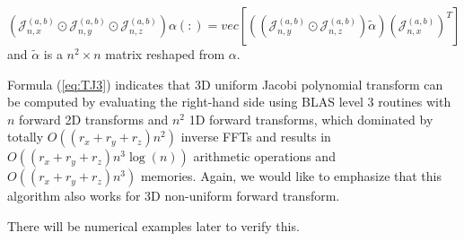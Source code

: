 \documentclass[11pt]{article}
\begin{document}
{{%

\begin{equation}
\label{eq:TJ3}
(\mathcal{J}_{n,x}^{(a,b)}\odot \mathcal{J}_{n,y}^{(a,b)}\odot \mathcal{J}_{n,z}^{(a,b)})\alpha(:) = vec\left[((\mathcal{J}_{n,y}^{(a,b)}\odot \mathcal{J}_{n,z}^{(a,b)})\tilde{\alpha}) (\mathcal{J}_{n,x}^{(a,b)})^{T}\right]
\end{equation}
and $\tilde{\alpha}$  is a $n^2 \times n$ matrix reshaped from $\alpha$.

Formula (\ref{eq:TJ3}) indicates that 3D uniform Jacobi polynomial transform can be computed by evaluating the right-hand side using BLAS level 3 routines with $n$ forward 2D transforms and $n^2$ 1D forward transforms, which dominated by totally $O((r_{x}+r_{y}+r_{z})n^2)$ inverse FFTs and results in $O((r_{x}+r_{y}+r_{z})n^3 \log(n))$ arithmetic operations and $O((r_{x}+r_{y}+r_{z})n^3)$ memories. Again, we would like to emphasize that this algorithm also works for 3D non-uniform forward transform.}} There will be numerical
examples later to verify this.
\end{document}
